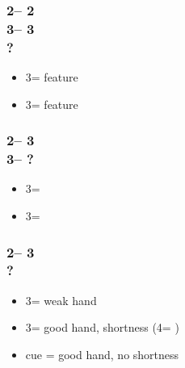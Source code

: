 \documentclass[12pt, a4paper]{report}
\begin{document}
{    \subsubsection*{2\spades -- 2\nt\\
                    3\diams -- 3\hearts\\
                    ?}
    \begin{itemize}
        \item 3\spades = \clubs feature
        \item 3\nt = \diams feature
    \end{itemize}

    \subsubsection*{2\spades -- 3\diams\\
                    3\hearts -- ?}
    \begin{itemize}
        \item 3\spades = \clubs
        \item 3\nt = \diams
    \end{itemize}

    \subsubsection*{2\spades -- 3\hearts\\
                    ?}
    \begin{itemize}
        \item 3\spades = weak hand
        \item 3\nt = good hand, shortness (4\clubs = \ahsf)
        \item cue = good hand, no shortness
    \end{itemize}
}
\end{document}
